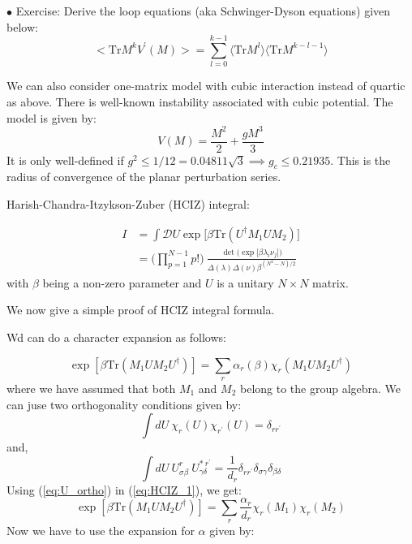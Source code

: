 \documentclass[11pt]{article}
\begin{document}
\begin{mdframed}[backgroundcolor=blue!3] 
	\textsc{} 
	$\bullet$ Exercise: Derive the loop equations (aka Schwinger-Dyson equations) given below: \\ 
	\begin{equation}
		\label{eq:LE} 
		\Big< \mbox{Tr} M^{k} V^{\prime}(M) \Big> = \sum_{l=0}^{k-1} \langle \mbox{Tr} M^{l} \rangle  \langle \mbox{Tr} M^{k-l-1} \rangle
		\nonumber
	\end{equation} 
\end{mdframed} 


We can also consider one-matrix model with cubic interaction instead of quartic as above. There is well-known instability associated with cubic potential. The model is given by:
\begin{equation}
	V(M) = \frac{M^2}{2} + \frac{gM^3}{3}  
\end{equation}
It is only well-defined if $ g^2 \le 1/12 = 0.04811 \sqrt{3} \implies g_{c} \le 0.21935$. This is the radius of convergence of the planar perturbation series. 


Harish-Chandra-Itzykson-Zuber (HCIZ) integral:

\begin{align}
	I &= \int \mathcal{D}U \exp \Big[ \beta \mbox{Tr} (U^{\dagger}M_1 U M_2)\Big] \\ 
	& =  \Bigg(\prod_{p=1}^{N-1} p! \Bigg) ~ \frac{\det \Big(\exp \Big[\beta \lambda_{i} \nu_{j}\Big]\Big)}{\Delta(\lambda) \Delta(\nu) \beta^{(N^2 - N)/2}} 
\end{align}
with $\beta$ being a non-zero parameter and $U$ is a unitary $N \times N$ matrix. 


We now give a simple proof of HCIZ integral formula. 

Wd can do a character expansion as follows:

\begin{equation}
	\label{eq:HCIZ_1} 
	\exp\left[\beta \mbox{Tr} (M_{1}UM_{2}U^{\dagger})\right]  = \sum_{r} \alpha_{r}(\beta) \chi_{r}(M_{1}UM_{2}U^{\dagger})
\end{equation}
where we have assumed that both $M_1$ and $M_2$ belong to the group algebra.
We can juse two orthogonality conditions given by:
\begin{equation}
	\int dU~\chi_{r}(U) \chi_{r^{\prime}}(U) = \delta_{r r^{\prime}} 
\end{equation}
and, 
\begin{equation}
	\label{eq:U_ortho} 
	\int dU~U^{r}_{\sigma\beta} ~ U^{* ~ r^{\prime}}_{\gamma\delta} = \frac{1}{d_{r}} \delta_{r r^{\prime}} \delta_{\sigma \gamma} \delta_{\beta \delta}
\end{equation}
Using (\ref{eq:U_ortho}) in (\ref{eq:HCIZ_1}), we get:
\begin{equation}
	\exp\left[\beta \mbox{Tr} (M_{1}UM_{2}U^{\dagger})\right]  = \sum_{r} \frac{\alpha_{r}}{d_r} \chi_{r}(M_{1}) \chi_{r}(M_{2})
\end{equation}
Now we have to use the expansion for $\alpha$ given by:
\end{document}

